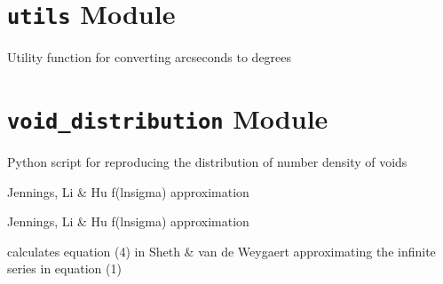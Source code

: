 \documentclass[letterpaper,10pt,english]{sphinxmanual}
\begin{document}
\section{\texttt{utils} Module}
\label{PyCosmo:utils-module}\label{PyCosmo:module-PyCosmo.utils}

\begin{fulllineitems}
\label{PyCosmo:PyCosmo.utils.as2deg}
Utility function for converting arcseconds to degrees

\end{fulllineitems}



\section{\texttt{void\_distribution} Module}
\label{PyCosmo:module-PyCosmo.void_distribution}\label{PyCosmo:void-distribution-module}
Python script for reproducing the
distribution of number density of voids

\begin{fulllineitems}
\label{PyCosmo:PyCosmo.void_distribution.multiplicity_function_jlh}
Jennings, Li \& Hu f(lnsigma) approximation

\end{fulllineitems}


\begin{fulllineitems}
\label{PyCosmo:PyCosmo.void_distribution.multiplicity_function_jlh_exact}
Jennings, Li \& Hu f(lnsigma) approximation

\end{fulllineitems}


\begin{fulllineitems}
\label{PyCosmo:PyCosmo.void_distribution.multiplicity_function_svdw}
calculates equation (4) in Sheth \& van de Weygaert
approximating the infinite series in equation (1)

\end{fulllineitems}
\end{document}
